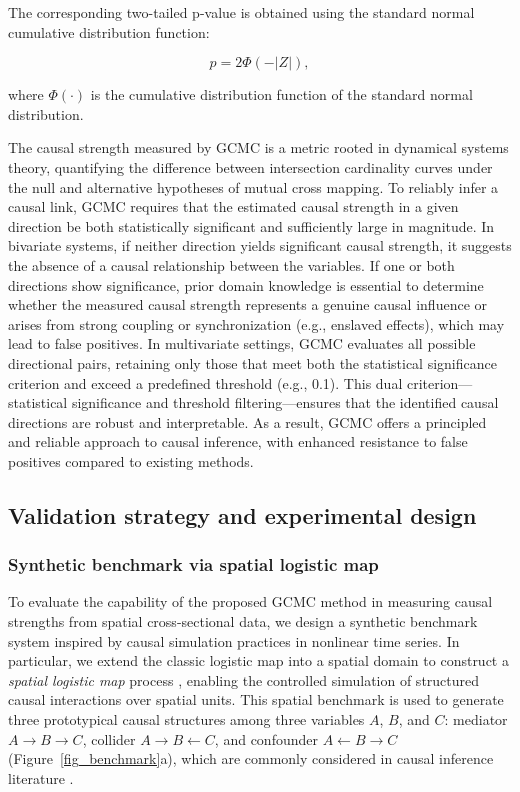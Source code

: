 \documentclass[authoryear,preprint,review,12pt]{elsarticle}
\begin{document}
The corresponding two-tailed p-value is obtained using the standard normal cumulative distribution function:

\begin{equation}
p = 2 \Phi(-|Z|),
\end{equation}

\noindent where \(\Phi(\cdot)\) is the cumulative distribution function of the standard normal distribution.

The causal strength measured by GCMC is a metric rooted in dynamical systems theory, quantifying the difference between intersection cardinality curves under the null and alternative hypotheses of mutual cross mapping. To reliably infer a causal link, GCMC requires that the estimated causal strength in a given direction be both statistically significant and sufficiently large in magnitude. In bivariate systems, if neither direction yields significant causal strength, it suggests the absence of a causal relationship between the variables. If one or both directions show significance, prior domain knowledge is essential to determine whether the measured causal strength represents a genuine causal influence or arises from strong coupling or synchronization (e.g., enslaved effects), which may lead to false positives. In multivariate settings, GCMC evaluates all possible directional pairs, retaining only those that meet both the statistical significance criterion and exceed a predefined threshold (e.g., 0.1). This dual criterion—statistical significance and threshold filtering—ensures that the identified causal directions are robust and interpretable. As a result, GCMC offers a principled and reliable approach to causal inference, with enhanced resistance to false positives compared to existing methods.

\subsection{Validation strategy and experimental design}

\subsubsection{Synthetic benchmark via spatial logistic map}

To evaluate the capability of the proposed GCMC method in measuring causal strengths from spatial cross-sectional data, we design a synthetic benchmark system inspired by causal simulation practices in nonlinear time series. In particular, we extend the classic logistic map into a spatial domain to construct a \textit{spatial logistic map} process \citep{willeboordse2003slm}, enabling the controlled simulation of structured causal interactions over spatial units. This spatial benchmark is used to generate three prototypical causal structures among three variables \(A\), \(B\), and \(C\): mediator $A \rightarrow B \rightarrow C$, collider $A \rightarrow B \leftarrow C$, and confounder $A \leftarrow B \rightarrow C$ (Figure~\ref{fig_benchmark}a), which are commonly considered in causal inference literature \citep{sanchez2024surd}.
\end{document}

